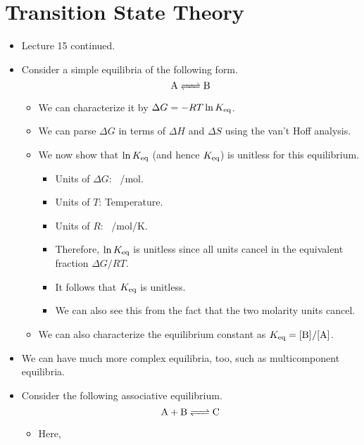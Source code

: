 \documentclass[../notes.tex]{subfiles}
\begin{document}
\section{Transition State Theory}
\begin{itemize}
    \item {}Lecture 15 continued.
    \item Consider a simple equilibria of the following form.
    \begin{equation*}
        \ce{A <=> B}
    \end{equation*}
    \begin{itemize}
        \item We can characterize it by $\Delta G=-RT\ln K_\textup{eq}$.
        \item We can parse $\Delta G$ in terms of $\Delta H$ and $\Delta S$ using the van't Hoff analysis.
        \item We now show that $\ln K_\textup{eq}$ (and hence $K_\textup{eq}$) is unitless for this equilibrium.
        \begin{itemize}
            \item Units of $\Delta G$: \si[per-mode=symbol]{\kilo\calorie\per\mole}.
            \item Units of $T$: Temperature.
            \item Units of $R$: \si[per-mode=symbol]{\kilo\calorie\per\mole\per\kelvin}.
            \item Therefore, $\ln K_\textup{eq}$ is unitless since all units cancel in the equivalent fraction $\Delta G/RT$.
            \item It follows that $K_\textup{eq}$ is unitless.
            \item We can also see this from the fact that the two molarity units cancel.
        \end{itemize}
        \item We can also characterize the equilibrium constant as $\Keq=\cnc{B}/\cnc{A}$.
    \end{itemize}
    \item We can have much more complex equilibria, too, such as multicomponent equilibria.
    \item Consider the following associative equilibrium.
    \begin{equation*}
        \ce{A + B <=> C}
    \end{equation*}
    \begin{itemize}
        \item Here,
        \begin{equation*}

\end{equation*}
\end{itemize}
\end{itemize}
\end{document}
